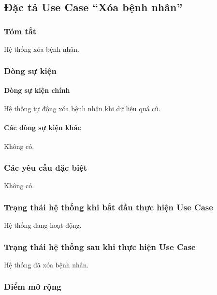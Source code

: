\subsection{Đặc tả Use Case ``Xóa bệnh nhân''}

\subsubsection{Tóm tắt}
Hệ thống xóa bệnh nhân.

\subsubsection{Dòng sự kiện}
\paragraph{\textbf{Dòng sự kiện chính}}
Hệ thống tự động xóa bệnh nhân khi dữ liệu quá cũ.

\paragraph{\textbf{Các dòng sự kiện khác}}
Không có.

\subsubsection{Các yêu cầu đặc biệt}
Không có.

\subsubsection{Trạng thái hệ thống khi bắt đầu thực hiện Use Case}
Hệ thống đang hoạt động.

\subsubsection{Trạng thái hệ thống sau khi thực hiện Use Case}
Hệ thống đã xóa bệnh nhân.

\subsubsection{Điểm mở rộng}